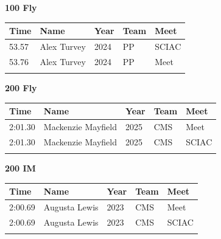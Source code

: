 \vspace{1.2em}
\noindent\begin{minipage}[t]{0.98\textwidth}
\centering
\textbf{\textcolor{teamprimary}{100 Fly}}\par
\vspace{0.5em}
\centering
\small
\renewcommand{\arraystretch}{1.0}
\setlength{\tabcolsep}{4pt}
\begin{tabular}{@{}p{2.5cm}p{4.5cm}p{1.5cm}p{2.5cm}p{2.5cm}@{}}
\toprule
\textbf{Time} & \textbf{Name} & \textbf{Year} & \textbf{Team} & \textbf{Meet} \\
\midrule
53.57 & Alex Turvey & 2024 & PP & SCIAC \\
53.76 & Alex Turvey & 2024 & PP & Meet \\
\bottomrule
\vspace{0.5em}
\end{tabular}
\end{minipage}
\vspace{1.2em}
\noindent\begin{minipage}[t]{0.98\textwidth}
\centering
\textbf{\textcolor{teamprimary}{200 Fly}}\par
\vspace{0.5em}
\centering
\small
\renewcommand{\arraystretch}{1.0}
\setlength{\tabcolsep}{4pt}
\begin{tabular}{@{}p{2.5cm}p{4.5cm}p{1.5cm}p{2.5cm}p{2.5cm}@{}}
\toprule
\textbf{Time} & \textbf{Name} & \textbf{Year} & \textbf{Team} & \textbf{Meet} \\
\midrule
2:01.30 & Mackenzie Mayfield & 2025 & CMS & Meet \\
2:01.30 & Mackenzie Mayfield & 2025 & CMS & SCIAC \\
\bottomrule
\vspace{0.5em}
\end{tabular}
\end{minipage}
\vspace{1.2em}
\noindent\begin{minipage}[t]{0.98\textwidth}
\centering
\textbf{\textcolor{teamprimary}{200 IM}}\par
\vspace{0.5em}
\centering
\small
\renewcommand{\arraystretch}{1.0}
\setlength{\tabcolsep}{4pt}
\begin{tabular}{@{}p{2.5cm}p{4.5cm}p{1.5cm}p{2.5cm}p{2.5cm}@{}}
\toprule
\textbf{Time} & \textbf{Name} & \textbf{Year} & \textbf{Team} & \textbf{Meet} \\
\midrule
2:00.69 & Augusta Lewis & 2023 & CMS & Meet \\
2:00.69 & Augusta Lewis & 2023 & CMS & SCIAC \\
\bottomrule
\vspace{0.5em}
\end{tabular}
\end{minipage}
